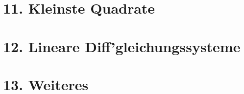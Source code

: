 \begin{multicols*}{4}
\colbreak

\section{11. Kleinste Quadrate}
\WhiteSpace
	
	

\newpage

\section{12. Lineare Diff'gleichungssysteme}
\WhiteSpace
	
	
	
	

\colbreak

\section{13. Weiteres}
\WhiteSpace
	
	
	
	
	

\mbox{}
	
\end{multicols*} 

